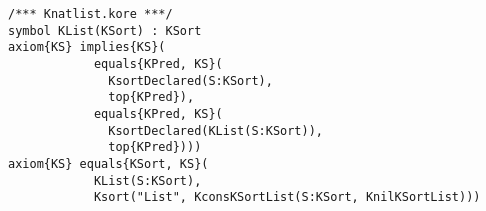 \documentclass[UTF8,11pt]{article}
\theoremstyle{plain}
\theoremstyle{definition}
\theoremstyle{remark}
\newcommand{\Exp}{\textit{Exp}}
\newcommand{\app}{\textit{app}}
\begin{document}
\begin{lstlisting}[language=kore]
/*** Knatlist.kore ***/
symbol KList(KSort) : KSort
axiom{KS} implies{KS}(
            equals{KPred, KS}(
              KsortDeclared(S:KSort),
              top{KPred}),
            equals{KPred, KS}(
              KsortDeclared(KList(S:KSort)),
              top{KPred})))
axiom{KS} equals{KSort, KS}(
            KList(S:KSort),
            Ksort("List", KconsKSortList(S:KSort, KnilKSortList)))
\end{lstlisting}
%
%
\end{document}
